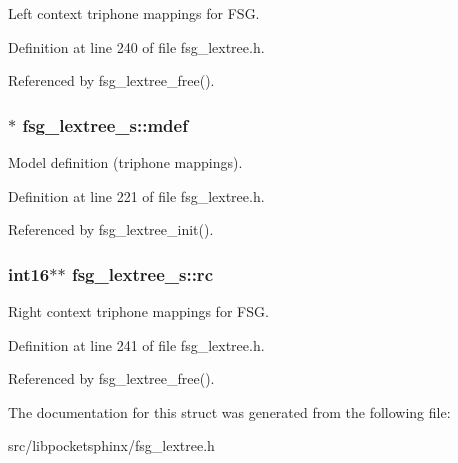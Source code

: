 Left context triphone mappings for F\-S\-G. 



Definition at line 240 of file fsg\-\_\-lextree.\-h.



Referenced by fsg\-\_\-lextree\-\_\-free().

\subsubsection[{mdef}]{$\ast$ fsg\-\_\-lextree\-\_\-s\-::mdef}\label{structfsg__lextree__s_ae2c059413a1cb4cda7068ab30a7a477c}


Model definition (triphone mappings). 



Definition at line 221 of file fsg\-\_\-lextree.\-h.



Referenced by fsg\-\_\-lextree\-\_\-init().

\subsubsection[{rc}]{\setlength{\rightskip}{0pt plus 5cm}int16$\ast$$\ast$ fsg\-\_\-lextree\-\_\-s\-::rc}\label{structfsg__lextree__s_a307d5351803d409aa51395333294c0f1}


Right context triphone mappings for F\-S\-G. 



Definition at line 241 of file fsg\-\_\-lextree.\-h.



Referenced by fsg\-\_\-lextree\-\_\-free().



The documentation for this struct was generated from the following file\-:\begin{DoxyCompactItemize}
\item 
src/libpocketsphinx/fsg\-\_\-lextree.\-h\end{DoxyCompactItemize}
